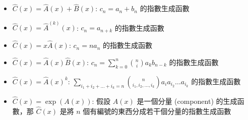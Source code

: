 \begin{itemize}
    \item $\hat C(x) = \hat A(x) + \hat B(x)$: $c_n=a_n+b_n$ 的指數生成函數
    \item $\hat C(x) = \hat A^{(k)}(x)$: $c_n=a_{n+k}$ 的指數生成函數
    \item $\hat C(x) = x\hat A(x)$: $c_n=na_n$ 的指數生成函數
    \item $\hat C(x) = \hat A(x)\hat B(x)$: $c_n=\sum_{k=0}^n \binom{n}{i} a_kb_{n-k}$ 的指數生成函數
    \item $\hat C(x) = \hat A(x)^k$: $\sum\limits_{i_1+i_2+\dots+i_k=n} \binom{n}{i_1,i_2,\dots,i_k}a_ia_{i_2}\dots a_{i_k}$ 的指數生成函數
	\item $\hat C(x) = \exp(A(x))$: 假設 $A(x)$ 是一個分量 (component) 的生成函數，那 $\hat C(x)$ 是將 $n$ 個有編號的東西分成若干個分量的指數生成函數
\end{itemize}
